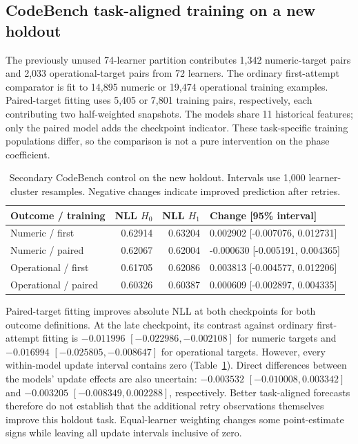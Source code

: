 \documentclass[11pt]{article}
\newcommand{\1}{\mathbb{I}}
\begin{document}
\subsection{CodeBench task-aligned training on a new holdout}
The previously unused 74-learner partition contributes 1,342 numeric-target pairs and 2,033 operational-target pairs from 72 learners. The ordinary first-attempt comparator is fit to 14,895 numeric or 19,474 operational training examples. Paired-target fitting uses 5,405 or 7,801 training pairs, respectively, each contributing two half-weighted snapshots. The models share 11 historical features; only the paired model adds the checkpoint indicator. These task-specific training populations differ, so the comparison is not a pure intervention on the phase coefficient.

\begin{table}[htbp]
\centering
\caption{Secondary CodeBench control on the new holdout. Intervals use 1,000 learner-cluster resamples. Negative changes indicate improved prediction after retries.}
\label{tab:codebenchpaired}
\begin{tabular}{lrrl}
\toprule
Outcome / training & NLL $H_0$ & NLL $H_1$ & Change [95\% interval] \\
\midrule
Numeric / first & 0.62914 & 0.63204 & 0.002902 [-0.007076, 0.012731] \\
Numeric / paired & 0.62067 & 0.62004 & -0.000630 [-0.005191, 0.004365] \\
Operational / first & 0.61705 & 0.62086 & 0.003813 [-0.004577, 0.012206] \\
Operational / paired & 0.60326 & 0.60387 & 0.000609 [-0.002897, 0.004335] \\
\bottomrule
\end{tabular}
\end{table}

Paired-target fitting improves absolute NLL at both checkpoints for both outcome definitions. At the late checkpoint, its contrast against ordinary first-attempt fitting is $-0.011996$ $[-0.022986,-0.002108]$ for numeric targets and $-0.016994$ $[-0.025805,-0.008647]$ for operational targets. However, every within-model update interval contains zero (Table~\ref{tab:codebenchpaired}). Direct differences between the models' update effects are also uncertain: $-0.003532$ $[-0.010008,0.003342]$ and $-0.003205$ $[-0.008349,0.002288]$, respectively. Better task-aligned forecasts therefore do not establish that the additional retry observations themselves improve this holdout task. Equal-learner weighting changes some point-estimate signs while leaving all update intervals inclusive of zero.
\end{document}
